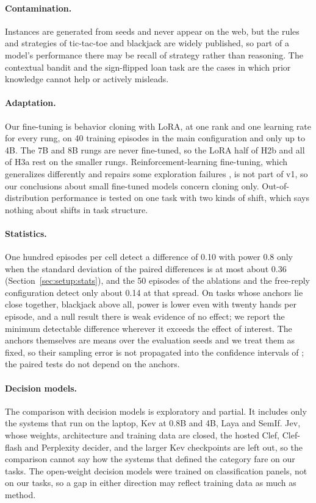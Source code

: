 \paragraph{Contamination.}
Instances are generated from seeds and never appear on the web, but the rules and strategies of tic-tac-toe and blackjack are widely published, so part of a model's performance there may be recall of strategy rather than reasoning. The contextual bandit and the sign-flipped loan task are the cases in which prior knowledge cannot help or actively misleads.

\paragraph{Adaptation.}
Our fine-tuning is behavior cloning with LoRA, at one rank and one learning rate for every rung, on 40 training episodes in the main configuration and only up to 4B. The 7B and 8B rungs are never fine-tuned, so the LoRA half of H2b and all of H3a rest on the smaller rungs. Reinforcement-learning fine-tuning, which generalizes differently \citep{chu2025sft} and repairs some exploration failures \citep{schmied2026greedy}, is not part of v1, so our conclusions about small fine-tuned models concern cloning only. Out-of-distribution performance is tested on one task with two kinds of shift, which says nothing about shifts in task structure.

\paragraph{Statistics.}
One hundred episodes per cell detect a difference of 0.10 with power 0.8 only when the standard deviation of the paired differences is at most about 0.36 (Section~\ref{sec:setup:stats}), and the 50 episodes of the ablations and the free-reply configuration detect only about 0.14 at that spread. On tasks whose anchors lie close together, blackjack above all, power is lower even with twenty hands per episode, and a null result there is weak evidence of no effect; we report the minimum detectable difference wherever it exceeds the effect of interest. The anchors themselves are means over the evaluation seeds and we treat them as fixed, so their sampling error is not propagated into the confidence intervals of \norm{}; the paired tests do not depend on the anchors.

\paragraph{Decision models.}
The comparison with decision models is exploratory and partial. It includes only the systems that run on the laptop, Kev at 0.8B and 4B, Laya and SemIf. Jev, whose weights, architecture and training data are closed, the hosted Clef, Clef-flash and Perplexity decider, and the larger Kev checkpoints are left out, so the comparison cannot say how the systems that defined the category fare on our tasks. The open-weight decision models were trained on classification panels, not on our tasks, so a gap in either direction may reflect training data as much as method.

